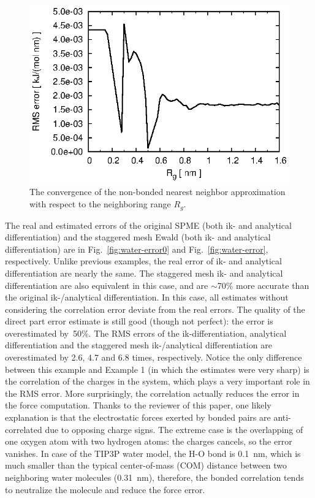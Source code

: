 \documentclass[aps,pre,preprint,unsortedaddress]{revtex4}
\newcommand{\recheck}[1]{{\color{red} #1}}
\begin{document}
\begin{figure}
  \centering
  \includegraphics[]{fig.gr.eps}
  \caption{The convergence of the non-bonded nearest neighbor approximation with respect to the neighboring range $R_g$.}
  \label{fig:gr-conv}
\end{figure}



The real and estimated errors of the original SPME
(both ik- and analytical differentiation)
and the staggered mesh Ewald (both ik- and analytical differentiation)
are in Fig.~\ref{fig:water-error0}
and Fig.~\ref{fig:water-error}, respectively.
Unlike previous examples, the real error of ik- and analytical differentiation
are nearly the same.
The staggered mesh ik- and analytical differentiation
are also equivalent in this case, and are $\sim$70\% more accurate
than the original ik-/analytical differentiation.
In this case,
all estimates without considering the correlation error
deviate from the real errors.
The quality of the direct
part error estimate is still good (though not perfect):
the error is overestimated by~50\%.
The RMS errors of the ik-differentiation, analytical differentiation
and the staggered mesh ik-/analytical differentiation are
overestimated by 2.6, 4.7 and 6.8 times, respectively.
Notice the only difference between this example
and Example 1 (in which the estimates were very sharp) is the correlation
of the charges in the system,
which plays a very important role in the RMS error. 
More surprisingly, the correlation
actually  reduces the error in the force computation.
\recheck{ Thanks to the reviewer of this paper, one likely
  explanation is that the electrostatic forces
  exerted by bonded pairs
  are anti-correlated due to opposing charge signs.
  The extreme case is the overlapping of one oxygen atom with two
  hydrogen atoms: the charges cancels, so the error vanishes.
  In case of the TIP3P water model, the H-O bond is 0.1~\textsf{nm},
  which is much smaller than the typical
  center-of-mass (COM) distance between two neighboring water
  molecules (0.31~\textsf{nm}),
  therefore, the bonded correlation tends to neutralize the molecule
  and reduce the force error.}
\end{document}
